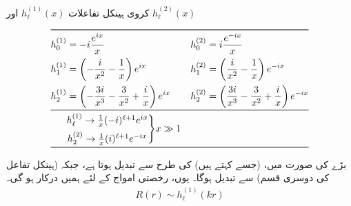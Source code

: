 \begin{table}[h!]
\centering
\caption{کروی ہینکل تفاعلات $h_{\ell}^{(1)}(x)$ اور $h_{\ell}^{(2)}(x)$}
\label{جدول_بکھراو_ہینکل_تفاعلات}
\begin{align*}
\toprule
h_0^{(1)}& = -i\frac{e^{ix}}{x} & & h_0^{(2)} = i\frac{e^{-ix}}{x} \\
h_1^{(1)} &= \left(-\frac{i}{x^2}-\frac{1}{x}\right)e^{ix} & & h_1^{(2)} = \left(\frac{i}{x^2}-\frac{1}{x}\right)e^{-ix} \\
h_2^{(1)} &= \left(-\frac{3i}{x^3}-\frac{3}{x^2}+\frac{i}{x}\right)e^{ix} & & h_2^{(2)} = \left(\frac{3i}{x^3}-\frac{3}{x^2}+\frac{i}{x}\right)e^{-ix}\\
\midrule
&\begin{matrix}
 	h_{\ell}^{(1)}\rightarrow\frac{1}{x}(-i)^{\ell+1}e^{ix} \\[0.5em]
 	h_2^{(2)}\rightarrow\frac{1}{x}(i)^{\ell+1}e^{-ix}
 \end{matrix}
	\Bigg\}x \gg 1\\
\bottomrule
\end{align*}
\end{table}
بڑے  کی صورت میں،  (جسے  کہتے ہیں)  کی طرح سے تبدیل ہوتا ہے، جبکہ  (ہینکل تفاعل کی دوسری قسم)  سے تبدیل ہوگا۔ یوں، رخصتی امواج کے لئے ہمیں  درکار ہو گی۔
\begin{align}
	R(r)\sim h^{(1)}_{\ell}(kr)
\end{align}

